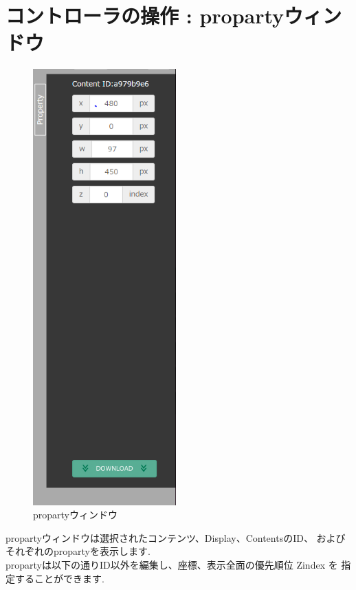 \documentclass[a4paper,10pt,oneside]{jsbook}
\begin{document}
\clearpage 

\chapter{コントローラの操作 : propartyウィンドウ }
\begin{figure}
	\begin{center}
		\includegraphics[width=5.5cm]{image/Prop_Down.PNG}
	\end{center}
	\caption{propartyウィンドウ}
	\label{fig:propall}
\end{figure}

propartyウィンドウは選択されたコンテンツ、Display、ContentsのID、
およびそれぞれのpropartyを表示します.\\

propartyは以下の通りID以外を編集し、座標、表示全面の優先順位 Zindex を
指定することができます.\\
\end{document}
